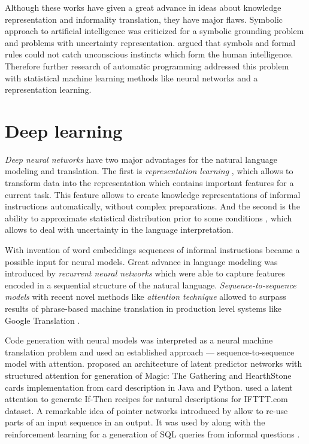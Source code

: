 Although these works have given a great advance in ideas about knowledge representation and informality translation, they have major flaws. Symbolic approach to artificial intelligence was criticized \parencite{mcdermott1987critique, harnad1990symbol} for a symbolic grounding problem and problems with uncertainty representation. \cite{dreyfus1994computers} argued that symbols and formal rules could not catch unconscious instincts which form the human intelligence. Therefore further research of automatic programming addressed this problem with statistical machine learning methods like neural networks and a representation learning.

\section{Deep learning} 
\emph{Deep neural networks} have two major advantages for the natural language modeling and translation. The first is \emph{representation learning} \parencite{Bengio2013}, which allows to transform data into the representation which contains important features for a current task. This feature allows to create knowledge representations of informal instructions automatically, without complex preparations. And the second is the ability to approximate statistical distribution prior to some conditions \parencite{white1992artificial}, which allows to deal with uncertainty in the language interpretation. 

With invention of word embeddings \parencite{bengio2003neural} sequences of informal instructions became a possible input for neural models. Great advance in language modeling was introduced by \emph{recurrent neural networks} \parencite{sundermeyer2012lstm, hochreiter1997long, Jozefowicz2016, Gers2001} which were able to capture features encoded in a sequential structure of the natural language. \emph{Sequence-to-sequence models} \parencite{NIPS2014_5346} with recent novel methods like \emph{attention technique} \parencite{Luong2015, Jean2014, Bahdanau2014} allowed to surpass results of phrase-based machine translation in production level systems like Google Translation \parencite{Wu2016}. 

Code generation with neural models was interpreted as a neural machine translation problem and used an established approach --- sequence-to-sequence model with attention. \cite{Ling2016} proposed an architecture of latent predictor networks with structured attention for generation of Magic: The Gathering and HearthStone cards implementation from card description in Java and Python. \cite{Chen2016} used a latent attention to generate If-Then recipes for natural descriptions for IFTTT.com dataset. A remarkable idea of pointer networks introduced by \cite{NIPS2015_5866} allow to re-use parts of an input sequence in an output. It was used by \cite{Zhong2017} along with the reinforcement learning for a generation of SQL queries from informal questions \parencite{Bhoopchand2016}. 

